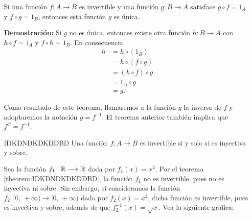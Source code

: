 \begin{theorem}{}{}
    Si una función $f:A \longrightarrow B$ es invertible y una función $g:B \longrightarrow A$ satisface $g \circ f = 1_A$ y $f \circ g = 1_B$, entonces esta función $g$ es única.

    \tcblower
    \textbf{\color{jblueleft}Demostración:} Si $g$ no es única, entonces existe otra función $h:B \longrightarrow A$ con $h \circ f = 1_A$ y $f \circ h = 1_B$. En consecuencia
    \begin{align*}
        h & = h \circ (1_B) \\
        & = h \circ (f \circ g) \\
        & = (h \circ f) \circ g \\
        & = 1_A \circ g \\
        & = g.
    \end{align*}
\end{theorem}

\begin{notation*}{}
    Como resultado de este teorema, llamaremos a la función $g$ la inversa de $f$ y adoptaremos la notación $g = f^{-1}$. El teorema anterior también implica que $f^C = f^{-1}$.
\end{notation*}

\begin{theorem}{}{IDKDNDKDKDDBD}
    Una función $f:A \longrightarrow B$ es invertible si y solo si es inyectiva y sobre.
\end{theorem}

\begin{myexample}
    Sea la función $f_1: \RR \longrightarrow \RR$ dada por $f_1(x) = x^2$. Por el teorema \ref{theorem:IDKDNDKDKDDBD}, la función $f_1$ no es invertible, pues no es inyectiva ni sobre. Sin embargo, si consideramos la función $f_2:[0, \, + \infty) \longrightarrow [0, \, +\infty)$ dada por $f_2(x) = x^2$, dicha función es invertible, pues es inyectiva y sobre, además de que $f_2^{-1}(x) = \sqrt{x}$. Vea la siguiente gráfica:
    \begin{center}
        \label{JAJSJJSJSJUJYBBNKOIJD}
    \end{center}
\end{myexample}

